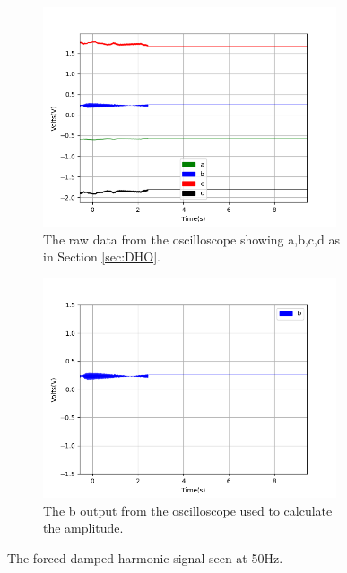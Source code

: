\begin{figure}[h!]
\centering
\begin{subfigure}[t]{.475\textwidth}
  \centering
  \includegraphics[width=0.95\textwidth, height=0.20\textheight]{figures/FDHO/scope_46raw.png}
  \caption{The raw data from the oscilloscope showing a,b,c,d as in Section \ref{sec:DHO}.}
 \label{fig:FDHO_50Hz_raw}
\end{subfigure}\hfill
\begin{subfigure}[t]{.475\textwidth}
  \centering
  \includegraphics[width=0.95\textwidth, height=0.20\textheight]{figures/FDHO/scope_46v_2.png}
  \caption{The b output from the oscilloscope used to calculate the amplitude.}
\label{fig:FDHO_50Hz_b}
\end{subfigure}
\caption{The forced damped harmonic signal seen at 50Hz.}
\label{fig:FDHO_50Hz}
\end{figure}